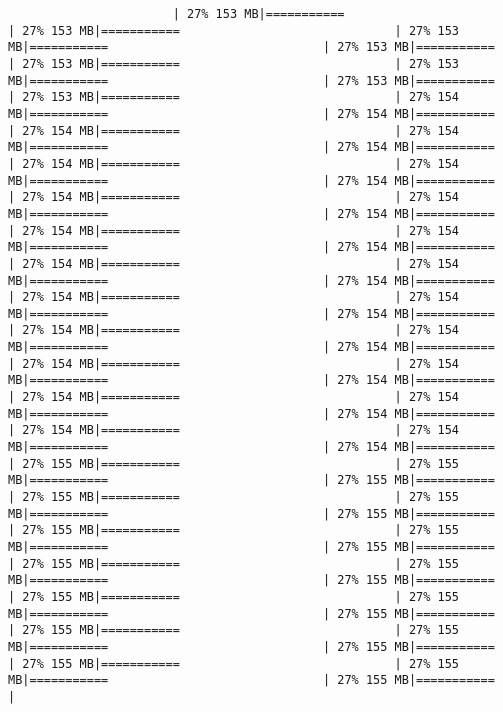 \documentclass[
]{article}
\begin{document}
\begin{verbatim}
                       | 27% 153 MB|===========                              | 27% 153 MB|===========                              | 27% 153 MB|===========                              | 27% 153 MB|===========                              | 27% 153 MB|===========                              | 27% 153 MB|===========                              | 27% 153 MB|===========                              | 27% 153 MB|===========                              | 27% 154 MB|===========                              | 27% 154 MB|===========                              | 27% 154 MB|===========                              | 27% 154 MB|===========                              | 27% 154 MB|===========                              | 27% 154 MB|===========                              | 27% 154 MB|===========                              | 27% 154 MB|===========                              | 27% 154 MB|===========                              | 27% 154 MB|===========                              | 27% 154 MB|===========                              | 27% 154 MB|===========                              | 27% 154 MB|===========                              | 27% 154 MB|===========                              | 27% 154 MB|===========                              | 27% 154 MB|===========                              | 27% 154 MB|===========                              | 27% 154 MB|===========                              | 27% 154 MB|===========                              | 27% 154 MB|===========                              | 27% 154 MB|===========                              | 27% 154 MB|===========                              | 27% 154 MB|===========                              | 27% 154 MB|===========                              | 27% 154 MB|===========                              | 27% 154 MB|===========                              | 27% 154 MB|===========                              | 27% 154 MB|===========                              | 27% 154 MB|===========                              | 27% 154 MB|===========                              | 27% 154 MB|===========                              | 27% 154 MB|===========                              | 27% 155 MB|===========                              | 27% 155 MB|===========                              | 27% 155 MB|===========                              | 27% 155 MB|===========                              | 27% 155 MB|===========                              | 27% 155 MB|===========                              | 27% 155 MB|===========                              | 27% 155 MB|===========                              | 27% 155 MB|===========                              | 27% 155 MB|===========                              | 27% 155 MB|===========                              | 27% 155 MB|===========                              | 27% 155 MB|===========                              | 27% 155 MB|===========                              | 27% 155 MB|===========                              | 27% 155 MB|===========                              | 27% 155 MB|===========                              | 27% 155 MB|===========                              | 27% 155 MB|===========                              | 27% 155 MB|===========                              | 27% 155 MB|===========                              | 
\end{verbatim}
\end{document}
